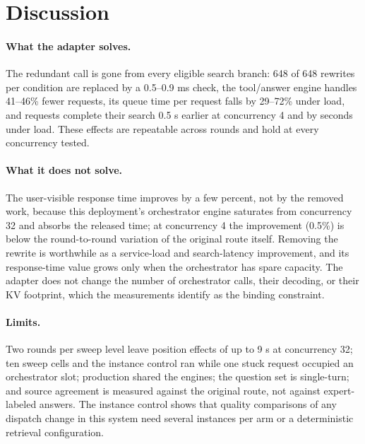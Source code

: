 \documentclass[paper]{ieice}
\begin{document}
\section{Discussion}
\paragraph{What the adapter solves.}
The redundant call is gone from every eligible search branch: 648 of 648 rewrites per condition are replaced by a 0.5--0.9 ms check, the tool/answer engine handles 41--46\% fewer requests, its queue time per request falls by 29--72\% under load, and requests complete their search 0.5 s earlier at concurrency 4 and by seconds under load. These effects are repeatable across rounds and hold at every concurrency tested.

\paragraph{What it does not solve.}
The user-visible response time improves by a few percent, not by the removed work, because this deployment's orchestrator engine saturates from concurrency 32 and absorbs the released time; at concurrency 4 the improvement (0.5\%) is below the round-to-round variation of the original route itself. Removing the rewrite is worthwhile as a service-load and search-latency improvement, and its response-time value grows only when the orchestrator has spare capacity. The adapter does not change the number of orchestrator calls, their decoding, or their KV footprint, which the measurements identify as the binding constraint.

\paragraph{Limits.}
Two rounds per sweep level leave position effects of up to 9 s at concurrency 32; ten sweep cells and the instance control ran while one stuck request occupied an orchestrator slot; production shared the engines; the question set is single-turn; and source agreement is measured against the original route, not against expert-labeled answers. The instance control shows that quality comparisons of any dispatch change in this system need several instances per arm or a deterministic retrieval configuration.
\end{document}
